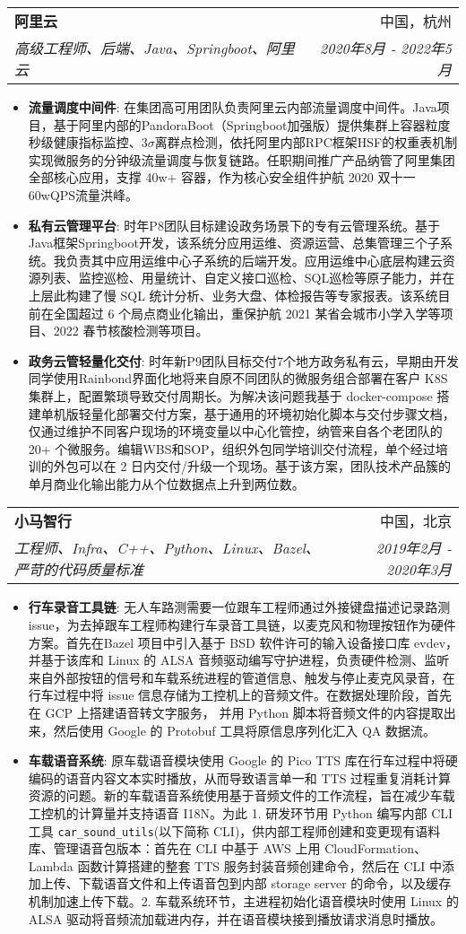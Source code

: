\documentclass[letterpaper,11pt]{article}
\makeatletter
\newcommand{\resumeItem}[2]{
	\item\small{
		\textbf{#1}{: #2 \vspace{-2pt}}
	}
}
\newcommand{\resumeSubheading}[4]{
	\vspace{-1pt}\item
	\begin{tabular*}{0.97\textwidth}[t]{l@{\extracolsep{\fill}}r}
		\textbf{#1} & #2 \\
		\textit{\small#3} & \textit{\small #4} \\
	\end{tabular*}\vspace{-5pt}
}
\newcommand{\resumeItemListStart}{\begin{itemize}}
\newcommand{\resumeItemListEnd}{\end{itemize}\vspace{-5pt}}
\makeatother
\begin{document}
\begin{spacing}{1.0}
		
		\resumeSubheading
		{阿里云}{中国，杭州}
		{高级工程师、后端、Java、Springboot、阿里云}{2020年8月 - 2022年5月}
		\resumeItemListStart
		\resumeItem{流量调度中间件}
		{在集团高可用团队负责阿里云内部流量调度中间件。Java项目，基于阿里内部的PandoraBoot（Springboot加强版）提供集群上容器粒度秒级健康指标监控、$3\sigma$离群点检测，依托阿里内部RPC框架HSF的权重表机制实现微服务的分钟级流量调度与恢复链路。任职期间推广产品纳管了阿里集团全部核心应用，支撑 40w+ 容器，作为核心安全组件护航 2020 双十一60wQPS流量洪峰。}
		\resumeItem{私有云管理平台}
		{时年P8团队目标建设政务场景下的专有云管理系统。基于Java框架Springboot开发，该系统分应用运维、资源运营、总集管理三个子系统。我负责其中应用运维中心子系统的后端开发。应用运维中心底层构建云资源列表、监控巡检、用量统计、自定义接口巡检、SQL巡检等原子能力，并在上层此构建了慢 SQL 统计分析、业务大盘、体检报告等专家报表。该系统目前在全国超过 6 个局点商业化输出，重保护航 2021 某省会城市小学入学等项目、2022 春节核酸检测等项目。}
		\resumeItem{政务云管轻量化交付}
		{时年新P9团队目标交付7个地方政务私有云，早期由开发同学使用Rainbond界面化地将来自原不同团队的微服务组合部署在客户 K8S 集群上，配置繁琐导致交付周期长。为解决该问题我基于 docker-compose 搭建单机版轻量化部署交付方案，基于通用的环境初始化脚本与交付步骤文档，仅通过维护不同客户现场的环境变量以中心化管控，纳管来自各个老团队的 20+ 个微服务。编辑WBS和SOP，组织外包同学培训交付流程，单个经过培训的外包可以在 2 日内交付/升级一个现场。基于该方案，团队技术产品簇的单月商业化输出能力从个位数据点上升到两位数。}
		\resumeItemListEnd
		
		\resumeSubheading
		{小马智行}{中国，北京}
		{工程师、Infra、C++、Python、Linux、Bazel、严苛的代码质量标准}{2019年2月 - 2020年3月}
		\resumeItemListStart
		\resumeItem{行车录音工具链}
		{无人车路测需要一位跟车工程师通过外接键盘描述记录路测 issue，为去掉跟车工程师构建行车录音工具链，以麦克风和物理按钮作为硬件方案。首先在Bazel 项目中引入基于 BSD 软件许可的输入设备接口库 evdev，并基于该库和 Linux 的 ALSA 音频驱动编写守护进程，负责硬件检测、监听来自外部按钮的信号和车载系统进程的管道信息、触发与停止麦克风录音，在行车过程中将 issue 信息存储为工控机上的音频文件。在数据处理阶段，首先在 GCP 上搭建语音转文字服务， 并用 Python 脚本将音频文件的内容提取出来，然后使用 Google 的 Protobuf 工具将原信息序列化汇入 QA 数据流。}
		\resumeItem{车载语音系统}
		{原车载语音模块使用 Google 的 Pico TTS 库在行车过程中将硬编码的语音内容文本实时播放，从而导致语言单一和 TTS 过程重复消耗计算资源的问题。新的车载语音系统使用基于音频文件的工作流程，旨在减少车载工控机的计算量并支持语音 I18N。为此 1. 研发环节用 Python 编写内部 CLI 工具 \texttt{car\_sound\_utils}(以下简称 CLI)，供内部工程师创建和变更现有语料库、管理语音包版本：首先在 CLI 中基于 AWS 上用 CloudFormation、Lambda 函数计算搭建的整套 TTS 服务封装音频创建命令，然后在 CLI 中添加上传、下载语音文件和上传语音包到内部 storage server 的命令，以及缓存机制加速上传下载。2. 车载系统环节，主进程初始化语音模块时使用 Linux 的 ALSA 驱动将音频流加载进内存，并在语音模块接到播放请求消息时播放。}
		\resumeItemListEnd
		

\end{spacing}
\end{document}
